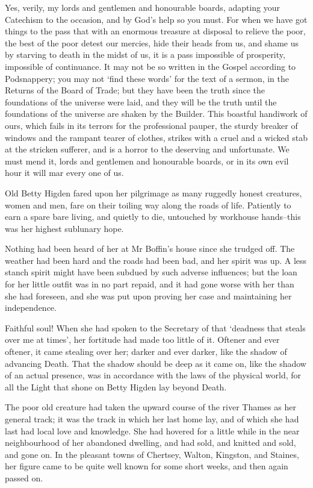 Yes, verily, my lords and gentlemen and honourable boards, adapting your
Catechism to the occasion, and by God’s help so you must. For when we
have got things to the pass that with an enormous treasure at disposal
to relieve the poor, the best of the poor detest our mercies, hide their
heads from us, and shame us by starving to death in the midst of us, it
is a pass impossible of prosperity, impossible of continuance. It may
not be so written in the Gospel according to Podsnappery; you may not
‘find these words’ for the text of a sermon, in the Returns of the Board
of Trade; but they have been the truth since the foundations of the
universe were laid, and they will be the truth until the foundations of
the universe are shaken by the Builder. This boastful handiwork of
ours, which fails in its terrors for the professional pauper, the sturdy
breaker of windows and the rampant tearer of clothes, strikes with a
cruel and a wicked stab at the stricken sufferer, and is a horror to
the deserving and unfortunate. We must mend it, lords and gentlemen and
honourable boards, or in its own evil hour it will mar every one of us.

Old Betty Higden fared upon her pilgrimage as many ruggedly honest
creatures, women and men, fare on their toiling way along the roads
of life. Patiently to earn a spare bare living, and quietly to die,
untouched by workhouse hands--this was her highest sublunary hope.

Nothing had been heard of her at Mr Boffin’s house since she trudged
off. The weather had been hard and the roads had been bad, and her
spirit was up. A less stanch spirit might have been subdued by such
adverse influences; but the loan for her little outfit was in no part
repaid, and it had gone worse with her than she had foreseen, and she
was put upon proving her case and maintaining her independence.

Faithful soul! When she had spoken to the Secretary of that ‘deadness
that steals over me at times’, her fortitude had made too little of it.
Oftener and ever oftener, it came stealing over her; darker and ever
darker, like the shadow of advancing Death. That the shadow should
be deep as it came on, like the shadow of an actual presence, was in
accordance with the laws of the physical world, for all the Light that
shone on Betty Higden lay beyond Death.

The poor old creature had taken the upward course of the river Thames as
her general track; it was the track in which her last home lay, and of
which she had last had local love and knowledge. She had hovered for a
little while in the near neighbourhood of her abandoned dwelling, and
had sold, and knitted and sold, and gone on. In the pleasant towns of
Chertsey, Walton, Kingston, and Staines, her figure came to be quite
well known for some short weeks, and then again passed on.

